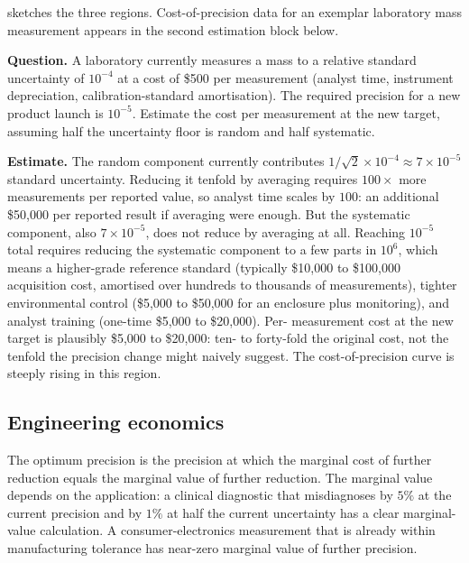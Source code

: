 

 sketches the three regions.
Cost-of-precision data for an exemplar laboratory mass measurement
appears in the second estimation block below.

\begin{estimation}
\textbf{Question.} A laboratory currently measures a mass to a
relative standard uncertainty of $10^{-4}$ at a cost of
\$500 per measurement (analyst time, instrument depreciation,
calibration-standard amortisation). The required precision for a
new product launch is $10^{-5}$. Estimate the cost per measurement
at the new target, assuming half the uncertainty floor is random
and half systematic.

\textbf{Estimate.} The random component currently contributes
$1/\sqrt{2} \times 10^{-4} \approx 7 \times 10^{-5}$ standard
uncertainty. Reducing it tenfold by averaging requires $100\times$
more measurements per reported value, so analyst time scales by
$100$: an additional \$50,000 per reported result if averaging
were enough. But the systematic component, also $7 \times 10^{-5}$,
does not reduce by averaging at all. Reaching $10^{-5}$ total
requires reducing the systematic component to a few parts in
$10^{6}$, which means a higher-grade reference standard
(typically \$10,000 to \$100,000 acquisition cost, amortised over
hundreds to thousands of measurements), tighter environmental
control (\$5,000 to \$50,000 for an enclosure plus monitoring),
and analyst training (one-time \$5,000 to \$20,000). Per-
measurement cost at the new target is plausibly \$5,000 to
\$20,000: ten- to forty-fold the original cost, not the tenfold
the precision change might naively suggest. The cost-of-precision
curve is steeply rising in this region.
\end{estimation}

\subsection{Engineering economics}

The optimum precision is the precision at which the marginal cost
of further reduction equals the marginal value of further
reduction. The marginal value depends on the application: a clinical
diagnostic that misdiagnoses by $5\%$ at the current precision and
by $1\%$ at half the current uncertainty has a clear marginal-value
calculation. A consumer-electronics measurement that is already
within manufacturing tolerance has near-zero marginal value of
further precision.

